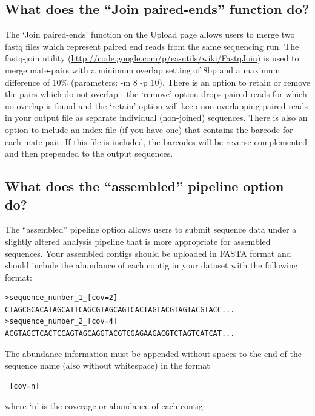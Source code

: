 \documentclass[12pt,fullpage]{report}
\begin{document}
\subsection{What does the ``Join paired-ends'' function do?}
The `Join paired-ends' function on the Upload page allows users to merge two fastq files which represent paired end reads from the same sequencing run. The fastq-join utility (\url{http://code.google.com/p/ea-utils/wiki/FastqJoin}) is used to merge mate-pairs with a minimum overlap setting of 8bp and a maximum difference of 10\% (parameters: -m 8 -p 10).  There is an option to retain or remove the pairs which do not overlap---the `remove' option drops paired reads for which no overlap is found and the `retain' option will keep non-overlapping paired reads in your output file as separate individual (non-joined) sequences.  There is also an option to include an index file (if you have one) that contains the barcode for each mate-pair.  If this file is included, the barcodes will be reverse-complemented and then prepended to the output sequences.
\subsection{What does the ``assembled'' pipeline option do?}
The ``assembled'' pipeline option allows users to submit sequence data under a slightly altered analysis pipeline that is more appropriate for assembled sequences. Your assembled contigs should be uploaded in FASTA format and should include the abundance of each contig in your dataset with the following format:

\begin{small}
\begin{verbatim}
>sequence_number_1_[cov=2]
CTAGCGCACATAGCATTCAGCGTAGCAGTCACTAGTACGTAGTACGTACC...
>sequence_number_2_[cov=4]
ACGTAGCTCACTCCAGTAGCAGGTACGTCGAGAAGACGTCTAGTCATCAT...
\end{verbatim}
\end{small}

\noindent
The abundance information must be appended without spaces to the end of the sequence name (also without whitespace) in the format
\begin{small}
\begin{verbatim}
_[cov=n]
\end{verbatim}
\end{small}
where `n' is the coverage or abundance of each contig.
\end{document}

